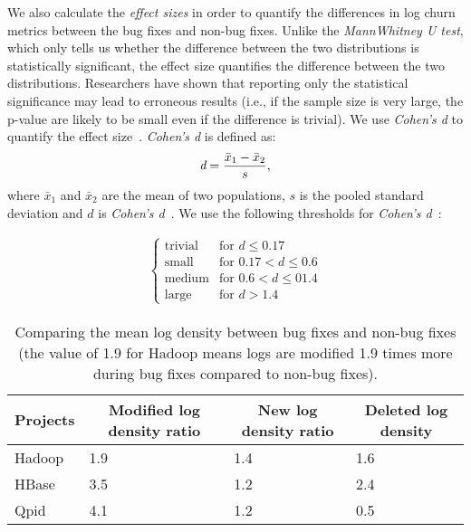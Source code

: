
We also calculate the {\em effect sizes} in order to quantify the differences in log churn metrics between the bug fixes and non-bug fixes. Unlike the {\em MannWhitney U test}, which only tells us whether the difference between the two distributions is statistically significant, the effect size quantifies the difference between the two distributions. Researchers have shown that reporting only the statistical significance may lead to erroneous results (i.e., if the sample size is very large, the p-value are likely to be small even if the difference is trivial). We use {\em Cohen's d} to quantify the effect size~\cite{cohenUsage1,cohenUsage2}. {\em Cohen's d} is defined as:
\begin{equation} \text{{\em d}} = \frac{\bar{x}_1 - \bar{x}_2}{s},
\label{eq:cohensd}
\end{equation}
where $\bar{x}_1$ and $\bar{x}_2$ are the mean of two populations, $s$ is the pooled standard deviation and $d$ is \emph{Cohen's d}~\cite{shadish2009combining}. We use the following thresholds for {\em Cohen's d}~\cite{Effectsize}:

 \begin{align}\label{cohens-d_interpretation-se}
\begin{cases}
\text{trivial}		& \text{for $d \le 0.17$}		\\
\text{small}		& \text{for $0.17 < d \le 0.6$}	\\
\text{medium}	& \text{for $0.6 < d \le 01.4$}	\\
\text{large}		& \text{for $d > 1.4$}
\end{cases}
\end{align}



\begin{table}[t]
	\protect\caption{Comparing the mean log density between bug fixes and non-bug fixes (the value of 1.9 for Hadoop means logs are modified 1.9 times more during bug fixes compared to non-bug fixes).}
	\begin{tabular}{|l|lll|}
		\hline 
		\multirow{1}{*}{Projects} & \multicolumn{1}{c}{Modified log density ratio} & \multicolumn{1}{c}{New log density ratio} & \multicolumn{1}{c|}{Deleted log density}\tabularnewline
		\hline 
		\multirow{1}{*}{Hadoop} & 1.9 & 1.4 & 1.6\tabularnewline
		\multirow{1}{*}{HBase} & 3.5 & 1.2 & 2.4\tabularnewline
		\multirow{1}{*}{Qpid} & 4.1 & 1.2 & 0.5\tabularnewline
		\hline 
	\end{tabular}
	\label{tba:logdensityNewLogs}
\end{table}


